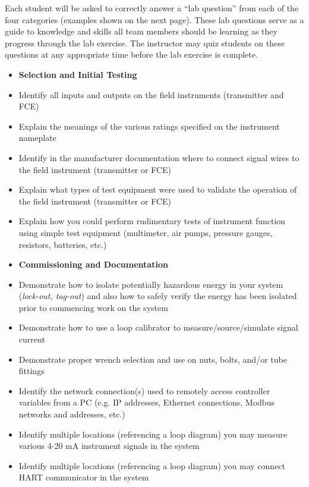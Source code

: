 Each student will be asked to correctly answer a ``lab question'' from each of the four categories (examples shown on the next page).  These lab questions serve as a guide to knowledge and skills all team members should be learning as they progress through the lab exercise.  The instructor may quiz students on these questions at any appropriate time before the lab exercise is complete.

\vfil \eject

\noindent
{} 

\begin{itemize}
\item{} {\bf Selection and Initial Testing}
\item{} Identify all inputs and outputs on the field instruments (transmitter and FCE)
\item{} Explain the meanings of the various ratings specified on the instrument nameplate
\item{} Identify in the manufacturer documentation where to connect signal wires to the field instrument (transmitter or FCE)
\item{} Explain what types of test equipment were used to validate the operation of the field instrument (transmitter or FCE)
\item{} Explain how you could perform rudimentary tests of instrument function using simple test equipment (multimeter, air pumps, pressure gauges, resistors, batteries, etc.)
\end{itemize}

\filbreak

\begin{itemize}
\item{} {\bf Commissioning and Documentation}
\item{} Demonstrate how to isolate potentially hazardous energy in your system ({\it lock-out, tag-out}) and also how to safely verify the energy has been isolated prior to commencing work on the system
\item{} Demonstrate how to use a loop calibrator to measure/source/simulate signal current
\item{} Demonstrate proper wrench selection and use on nuts, bolts, and/or tube fittings
\item{} Identify the network connection(s) used to remotely access controller variables from a PC (e.g. IP addresses, Ethernet connections, Modbus networks and addresses, etc.)
\item{} Identify multiple locations (referencing a loop diagram) you may measure various 4-20 mA instrument signals in the system
\item{} Identify multiple locations (referencing a loop diagram) you may connect HART communicator in the system
\end{itemize}

